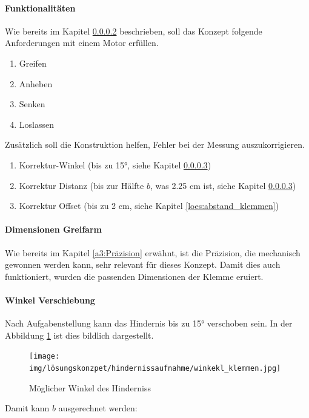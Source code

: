 \documentclass[../main.tex]{subfiles}
\begin{document}
\paragraph{Funktionalitäten}
Wie bereits im Kapitel \ref{} beschrieben, soll das Konzept folgende Anforderungen mit einem Motor erfüllen.
\begin{enumerate}
    \item Greifen
    \item Anheben
    \item Senken
    \item Loslassen
\end{enumerate}

Zusätzlich soll die Konstruktion helfen, Fehler bei der Messung auszukorrigieren.
\begin{enumerate}
    \item Korrektur-Winkel (bis zu 15°, siehe Kapitel \ref{loes:winkel_verschiebung})
    \item Korrektur Distanz (bis zur Hälfte $b$, was 2.25 cm ist, siehe Kapitel \ref{loes:winkel_verschiebung})
    \item Korrektur Offset (bis zu 2 cm, siehe Kapitel \ref{loes:abstand_klemmen})
\end{enumerate}

\newpage

\paragraph{Dimensionen Greifarm}
Wie bereits im Kapitel \ref{a3:Präzision} erwähnt, ist die Präzision, die mechanisch gewonnen werden kann, sehr relevant für dieses Konzept. Damit dies auch funktioniert, wurden die passenden Dimensionen der Klemme eruiert. 

\paragraph{Winkel Verschiebung} \label{loes:winkel_verschiebung}
Nach Aufgabenstellung kann das Hindernis bis zu 15° verschoben sein.
In der Abbildung \ref{img:loes_winkel_hinderniss} ist dies bildlich dargestellt.

\begin{figure}[H]
        \centering
        \texttt{[image: img/lösungskonzpet/hindernissaufnahme/winkekl\_klemmen.jpg]}
        \caption {Möglicher Winkel des Hinderniss}
        \label{img:loes_winkel_hinderniss}
\end{figure}

Damit kann $b$ ausgerechnet werden:
\end{document}
